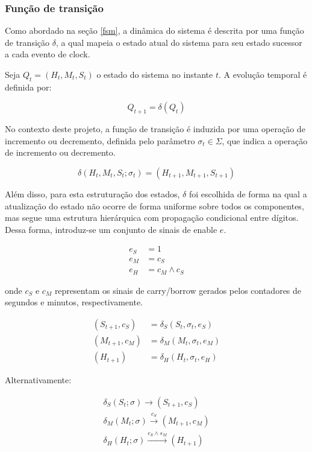 \subsubsection{Função de transição}

Como abordado na seção \ref{fsm}, a dinâmica do sistema é descrita por uma função de transição $\delta$, a qual mapeia o estado atual do sistema para seu estado sucessor a cada evento de clock.

Seja $Q_t = (H_t, M_t, S_t)$ o estado do sistema no instante $t$. A evolução temporal é definida por:

\[
Q_{t+1} = \delta(Q_t)
\]

No contexto deste projeto, a função de transição é induzida por uma operação de incremento ou decremento, definida pelo parâmetro $\sigma_t \in \Sigma$, que indica a operação de incremento ou decremento.

\[
\delta(H_t, M_t, S_t; \sigma_t) = (H_{t+1}, M_{t+1}, S_{t+1})
\]

Além disso, para esta estruturação dos estados, $\delta$ foi escolhida de forma na qual a atualização do estado não ocorre de forma uniforme sobre todos os componentes, mas segue uma estrutura hierárquica com propagação condicional entre dígitos.
Dessa forma, introduz-se um conjunto de sinais de enable $e$.

\begin{align*}
e_S &= 1 \\
e_M &= c_S \\
e_H &= c_M \land c_S
\end{align*}

onde $c_S$ e $c_M$ representam os sinais de carry/borrow gerados pelos contadores de segundos e minutos, respectivamente.

\begin{align*}
    (S_{t+1}, c_S) &= \delta_S(S_t, \sigma_t, e_S) \\
    (M_{t+1}, c_M) &= \delta_M(M_t, \sigma_t, e_M) \\
    (H_{t+1}) &= \delta_H(H_t, \sigma_t, e_H)
\end{align*}

Alternativamente: 

\begin{align*}
    \delta_S(S_t; \sigma) \rightarrow (S_{t+1}, c_S)\\
    \delta_M(M_t; \sigma) \xrightarrow{c_S} (M_{t+1}, c_M) \\
    \delta_H(H_t; \sigma) \xrightarrow{c_S \land s_M} (H_{t+1})
\end{align*}

